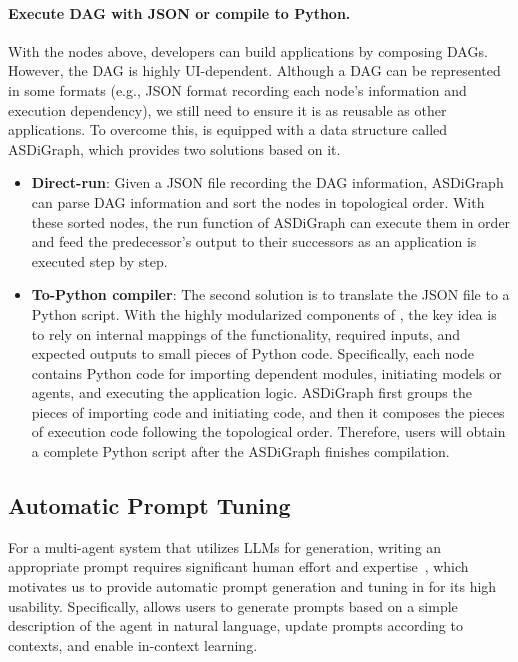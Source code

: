 \paragraph{Execute DAG with JSON or compile to Python.}
With the nodes above, developers can build applications by composing DAGs. However, the DAG is highly UI-dependent. Although a DAG can be represented in some formats (e.g., JSON format recording each node's information and execution dependency), we still need to ensure it is as reusable as other applications. To overcome this, \ours is equipped with a data structure called ASDiGraph, which provides two solutions based on it. 
\begin{itemize}
    \item 
    {\bf Direct-run}: Given a JSON file recording the DAG information, ASDiGraph can parse DAG information and sort the nodes in topological order. With these sorted nodes, the run function of ASDiGraph can execute them in order and feed the predecessor's output to their successors as an application is executed step by step.

    \item 
    {\bf To-Python compiler}: The second solution is to translate the JSON file to a Python script. With the highly modularized components of \ours, the key idea is to rely on internal mappings of the functionality, required inputs, and expected outputs to small pieces of Python code. Specifically, each node contains Python code for importing dependent modules, initiating models or agents, and executing the application logic. ASDiGraph first groups the pieces of importing code and initiating code, and then it composes the pieces of execution code following the topological order.
    Therefore, users will obtain a complete Python script after the ASDiGraph finishes compilation.
\end{itemize}





\subsection{Automatic Prompt Tuning}
\label{sebsec:prompt_tuning}
For a multi-agent system that utilizes LLMs for generation, writing an appropriate prompt requires significant human effort and expertise~\citep{pryzant2023automatic}, which motivates us to provide automatic prompt generation and tuning in \ours for its high usability. Specifically, \ours allows users to generate prompts based on a simple description of the agent in natural language, update prompts according to contexts, and enable in-context learning.

